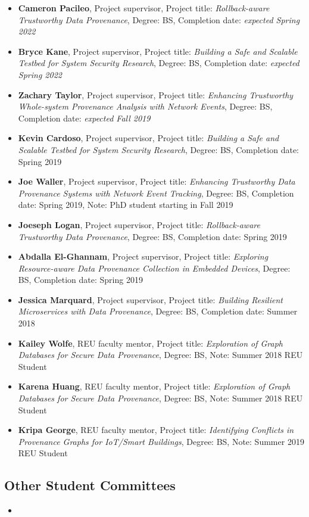 \begin{itemize}
\tightlist
\item \textbf{Cameron Pacileo}, Project supervisor, Project title: \textit{Rollback-aware Trustworthy Data Provenance}, Degree: BS, Completion date: \textit{expected Spring 2022}
\item \textbf{Bryce Kane}, Project supervisor, Project title: \textit{Building a Safe and Scalable Testbed for System Security Research}, Degree: BS, Completion date: \textit{expected Spring 2022}
\item \textbf{Zachary Taylor}, Project supervisor, Project title: \textit{Enhancing Trustworthy Whole-system Provenance Analysis with Network Events}, Degree: BS, Completion date: \textit{expected Fall 2019}
\item \textbf{Kevin Cardoso}, Project supervisor, Project title: \textit{Building a Safe and Scalable Testbed for System Security Research}, Degree: BS, Completion date: Spring 2019
\item \textbf{Joe Waller}, Project supervisor, Project title: \textit{Enhancing Trustworthy Data Provenance Systems with Network Event Tracking}, Degree: BS, Completion date: Spring 2019, Note: PhD student starting in Fall 2019
\item \textbf{Joeseph Logan}, Project supervisor, Project title: \textit{Rollback-aware Trustworthy Data Provenance}, Degree: BS, Completion date: Spring 2019
\item \textbf{Abdalla El-Ghannam}, Project supervisor, Project title: \textit{Exploring Resource-aware Data Provenance Collection in Embedded Devices}, Degree: BS, Completion date: Spring 2019
\item \textbf{Jessica Marquard}, Project supervisor, Project title: \textit{Building Resilient Microservices with Data Provenance}, Degree: BS, Completion date: Summer 2018
\item \textbf{Kailey Wolfe}, REU faculty mentor, Project title: \textit{Exploration of Graph Databases for Secure Data Provenance}, Degree: BS, Note: Summer 2018 REU Student
\item \textbf{Karena Huang}, REU faculty mentor, Project title: \textit{Exploration of Graph Databases for Secure Data Provenance}, Degree: BS, Note: Summer 2018 REU Student
\item \textbf{Kripa George}, REU faculty mentor, Project title: \textit{Identifying Conflicts in Provenance Graphs for IoT/Smart Buildings}, Degree: BS, Note: Summer 2019 REU Student
\end{itemize}

\hypertarget{student-committees}{%
\subsection{Other Student Committees}\label{student-committees}}
\begin{itemize}
\tightlist

\item

\end{itemize}